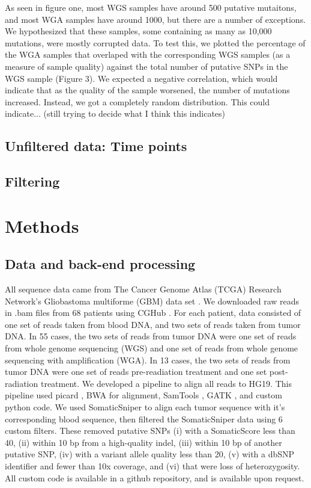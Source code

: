 \documentclass[11pt]{article} %
\begin{document}
As seen in figure one, most WGS samples have around 500 putative mutaitons, and most WGA samples have around 1000, but there are a number of exceptions. We hypothesized that these samples, some containing as many as 10,000 mutations, were mostly corrupted data. To test this, we plotted the percentage of the WGA samples that overlaped with the corresponding WGS samples (as a measure of sample quality) against the total number of putative SNPs in the WGS sample (Figure 3). We expected a negative correlation, which would indicate that as the quality of the sample worsened, the number of mutations increased. Instead, we got a completely random distribution. This could indicate... (still trying to decide what I think this indicates)

\subsection{Unfiltered data: Time points}

\subsection{Filtering}

\section{Methods}

\subsection{Data and back-end processing}

All sequence data came from The Cancer Genome Atlas (TCGA) Research Network's Gliobastoma multiforme (GBM) data set \cite{TCGA-GBM}. We downloaded raw reads in .bam files from 68 patients using CGHub \cite{CGHub}. For each patient, data consisted of one set of reads taken from blood DNA, and two sets of reads taken from tumor DNA. In 55 cases, the two sets of reads from tumor DNA were one set of reads from whole genome sequencing (WGS) and one set of reads from whole genome sequencing with amplification (WGA). In 13 cases, the two sets of reads from tumor DNA were one set of reads pre-readiation treatment and one set post-radiation treatment. We developed a pipeline to align all reads to HG19. This pipeline used picard \cite{picard}, BWA \cite{BWA} for alignment, SamTools \cite{SAMtools}, GATK \cite{GATK}, and custom python code. We used SomaticSniper \cite{SomaticSniper} to align each tumor sequence with it's corresponding blood sequence, then filtered the SomaticSniper data using 6 custom filters. These removed putative SNPs (i) with a SomaticScore less than 40, (ii) within 10 bp from a high-quality indel, (iii) within 10 bp of another putative SNP, (iv) with a variant allele quality less than 20, (v) with a dbSNP \cite{dbSNP} identifier and fewer than 10x coverage, and (vi) that were loss of heterozygosity. All custom code is available in a github repository, and is available upon request.
\end{document}
